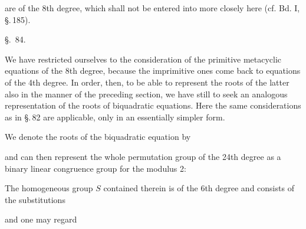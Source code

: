 are of the 8th degree, which shall not be entered into more closely
here (cf. Bd. I, \S.\,185).

\begin{center}
\S.\ 84.

\end{center}

We have restricted ourselves to the consideration of the primitive
metacyclic equations of the 8th degree, because the imprimitive ones
come back to equations of the 4th degree. In order, then, to be able to
represent the roots of the latter also in the manner of the preceding
section, we have still to seek an analogous representation of the roots
of biquadratic equations. Here the same considerations as in
\S.\,82 are applicable, only in an essentially simpler form.

We denote the roots of the biquadratic equation by

and can then represent the whole permutation group of the 24th
degree as a binary linear congruence group for the modulus 2:

The homogeneous group $S$ contained therein is of the 6th
degree and consists of the substitutions

and one may regard

